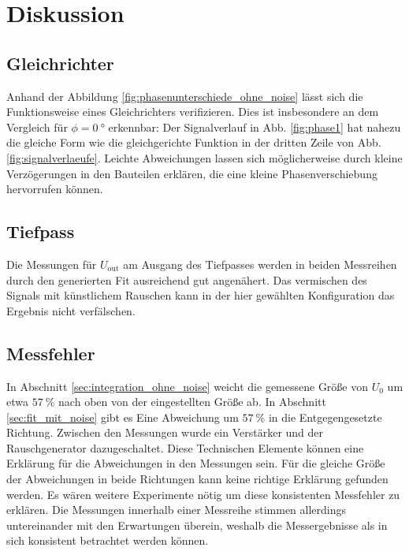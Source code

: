 \section{Diskussion}
\subsection{Gleichrichter}
Anhand der Abbildung \ref{fig:phasenunterschiede_ohne_noise} lässt sich die Funktionsweise eines Gleichrichters verifizieren.
Dies ist insbesondere an dem Vergleich für $\phi = \qty[]{0}{\degree}$ erkennbar:
Der Signalverlauf in Abb. \ref{fig:phase1} hat nahezu die gleiche Form wie 
die gleichgerichte Funktion in der dritten Zeile von Abb. \ref{fig:signalverlaeufe}.
Leichte Abweichungen lassen sich möglicherweise durch kleine Verzögerungen in den Bauteilen erklären, die eine kleine
Phasenverschiebung hervorrufen können.

\subsection{Tiefpass}

Die Messungen für $U_\text{out}$ am Ausgang des Tiefpasses 
werden in beiden Messreihen durch den generierten Fit ausreichend gut angenähert.
Das vermischen des Signals mit künstlichem Rauschen kann in der hier gewählten Konfiguration das Ergebnis nicht verfälschen.

\subsection{Messfehler}

In Abschnitt \ref{sec:integration_ohne_noise} weicht die gemessene Größe von $U_0$ um etwa $\qty[]{57}{\percent}$ nach oben von der eingestellten Größe ab.
In Abschnitt \ref{sec:fit_mit_noise} gibt es Eine Abweichung um $\qty[]{57}{\percent}$ in die Entgegengesetzte Richtung.
Zwischen den Messungen wurde ein Verstärker und der Rauschgenerator dazugeschaltet.
Diese Technischen Elemente können eine Erklärung für die Abweichungen in den Messungen sein.
Für die gleiche Größe der Abweichungen in beide Richtungen kann keine richtige Erklärung gefunden werden.
Es wären weitere Experimente nötig um diese konsistenten Messfehler zu erklären.
Die Messungen innerhalb einer Messreihe stimmen allerdings untereinander mit den Erwartungen überein, 
weshalb die Messergebnisse als in sich konsistent betrachtet werden können.



